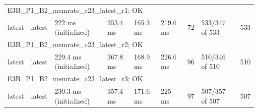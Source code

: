 \begin{tabular}{lllllllll}
\multicolumn{9}{l}{E3B\_P1\_B2\_memrate\_c23\_latest\_r1; OK} \\
latest & latest & 222 ms (initialized) & 353.4 ms & 165.3 ms & 219.6 ms & 72 & 533/347 of 533 & 533 \\
\multicolumn{9}{l}{E3B\_P1\_B2\_memrate\_c23\_latest\_r2; OK} \\
latest & latest & 229.4 ms (initialized) & 367.8 ms & 168.9 ms & 226.6 ms & 96 & 510/346 of 510 & 510 \\
\multicolumn{9}{l}{E3B\_P1\_B2\_memrate\_c23\_latest\_r3; OK} \\
latest & latest & 230.3 ms (initialized) & 357.4 ms & 171.6 ms & 225 ms & 97 & 507/357 of 507 & 507 \\
\bottomrule
\end{tabular}
